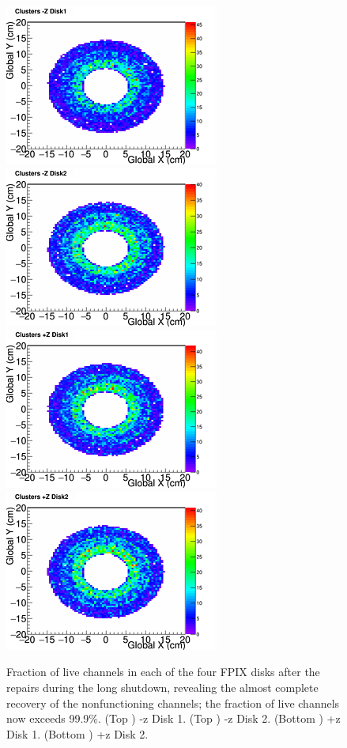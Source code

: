 \begin{figure}[hbtp]
  \begin{center}
    \includegraphics[width=1.0\cmsFigWidth]{figures/FPIX-d1-mz-after}
    \includegraphics[width=1.0\cmsFigWidth]{figures/FPIX-d2-mz-after}
    \includegraphics[width=1.0\cmsFigWidth]{figures/FPIX-d1-pz-after}
    \includegraphics[width=1.0\cmsFigWidth]{figures/FPIX-d2-pz-after}
    \caption{Fraction of live channels in each of the four FPIX disks after the repairs during the long shutdown, revealing the almost complete recovery of the nonfunctioning channels; the fraction of live channels now exceeds 99.9\%. (Top \cmsLeft) -z Disk 1. (Top \cmsRight) -z Disk 2. (Bottom \cmsLeft) +z Disk 1. (Bottom \cmsRight) +z Disk 2.}
    \label{fig:fpix-live-after}
  \end{center}
\end{figure}

